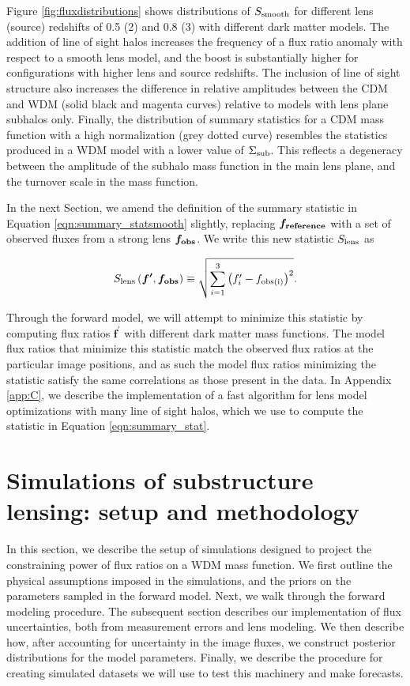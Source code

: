 Figure \ref{fig:fluxdistributions} shows distributions of $S_{\rm{smooth}}$ for different lens (source) redshifts of 0.5 (2) and 0.8 (3) with different dark matter models. The addition of line of sight halos increases the frequency of a flux ratio anomaly with respect to a smooth lens model, and the boost is substantially higher for configurations with higher lens and source redshifts. The inclusion of line of sight structure also increases the difference in relative amplitudes between the CDM and WDM (solid black and magenta curves) relative to models with lens plane subhalos only. Finally, the distribution of summary statistics for a CDM mass function with a high normalization (grey dotted curve) resembles the statistics produced in a WDM model with a lower value of $\Sigma_{\rm{sub}}$. This reflects a degeneracy between the amplitude of the subhalo mass function in the main lens plane, and the turnover scale in the mass function. 

In the next Section, we amend the definition of the summary statistic in Equation \ref{eqn:summary_statsmooth} slightly, replacing $\boldsymbol{f_{\rm{reference}}}$ with a set of observed fluxes from a strong lens $\boldsymbol{f_{\rm{obs}}}$. We write this new statistic $S_{\rm{lens}}$ as

\begin{equation}
\label{eqn:summary_stat}
S_{\rm{lens}} \left(\boldsymbol{f^{\prime}},\boldsymbol{f_{\rm{obs}}} \right) \equiv \sqrt{\sum_{i=1}^{3} \left({f}^{\prime}_{i} - f_{\rm{obs(i)}} \right)^2}.
\end{equation}

Through the forward model, we will attempt to minimize this statistic by computing flux ratios $\boldsymbol{f^{\prime}}$ with different dark matter mass functions. The model flux ratios that minimize this statistic match the observed flux ratios at the particular image positions, and as such the model flux ratios minimizing the statistic satisfy the same correlations as those present in the data. In Appendix \ref{app:C}, we describe the implementation of a fast algorithm for lens model optimizations with many line of sight halos, which we use to compute the statistic in Equation \ref{eqn:summary_stat}. 

\section{Simulations of substructure lensing: setup and methodology}
\label{sec:simsetup}
In this section, we describe the setup of simulations designed to project the constraining power of flux ratios on a WDM mass function. We first outline the physical assumptions imposed in the simulations, and the priors on the parameters sampled in the forward model. Next, we walk through the forward modeling procedure. The subsequent section describes our implementation of flux uncertainties, both from measurement errors and lens modeling. We then describe how, after accounting for uncertainty in the image fluxes, we construct posterior distributions for the model parameters. Finally, we describe the procedure for creating simulated datasets we will use to test this machinery and make forecasts.  

